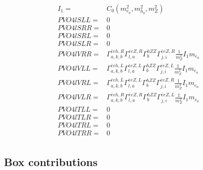 \documentclass[A4,landscape]{article}
\begin{document}
\begin{align} 
I_1= & C_0(m^2_{e_{{a}}}, m^2_{h_{{b}}}, m^2_{Z}) \\ 
  PVO4lSLL= & 0 \\ 
  PVO4lSRR= & 0 \\ 
  PVO4lSRL= & 0 \\ 
  PVO4lSLR= & 0 \\ 
  PVO4lVRR= &  \Gamma^{\bar{e}e h ,R}_{a, k, b} \Gamma^{\bar{e}e Z ,R}_{l, a} \Gamma^{h Z Z }_{b} \Gamma^{\bar{e}e Z ,R}_{j, i} \frac{1}{m^2_{Z}} I_1 m_{e_{{a}}} \\ 
  PVO4lVLL= &  \Gamma^{\bar{e}e h ,L}_{a, k, b} \Gamma^{\bar{e}e Z ,L}_{l, a} \Gamma^{h Z Z }_{b} \Gamma^{\bar{e}e Z ,L}_{j, i} \frac{1}{m^2_{Z}} I_1 m_{e_{{a}}} \\ 
  PVO4lVRL= &  \Gamma^{\bar{e}e h ,L}_{a, k, b} \Gamma^{\bar{e}e Z ,L}_{l, a} \Gamma^{h Z Z }_{b} \Gamma^{\bar{e}e Z ,R}_{j, i} \frac{1}{m^2_{Z}} I_1 m_{e_{{a}}} \\ 
  PVO4lVLR= &  \Gamma^{\bar{e}e h ,R}_{a, k, b} \Gamma^{\bar{e}e Z ,R}_{l, a} \Gamma^{h Z Z }_{b} \Gamma^{\bar{e}e Z ,L}_{j, i} \frac{1}{m^2_{Z}} I_1 m_{e_{{a}}} \\ 
  PVO4lTLL= & 0 \\ 
  PVO4lTLR= & 0 \\ 
  PVO4lTRL= & 0 \\ 
  PVO4lTRR= & 0 \\ 
\end{align} 
\subsection{Box contributions} 
\end{document}

